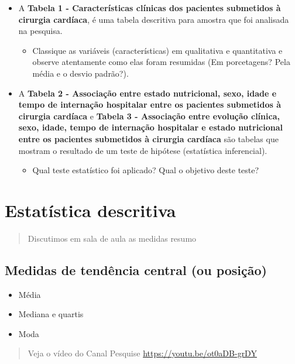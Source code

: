\documentclass[
]{book}
\providecommand{\tightlist}{%
  \setlength{\itemsep}{0pt}\setlength{\parskip}{0pt}}
\begin{document}
\begin{itemize}
\item
  A \textbf{Tabela 1 - Características clínicas dos pacientes submetidos à cirurgia cardíaca}, é uma tabela descritiva para amostra que foi analisada na pesquisa.

  \begin{itemize}
  \tightlist
  \item
    Classique as variáveis (características) em qualitativa e quantitativa e observe atentamente como elas foram resumidas (Em porcetagens? Pela média e o desvio padrão?).
  \end{itemize}
\item
  A \textbf{Tabela 2 - Associação entre estado nutricional, sexo, idade e tempo de internação hospitalar entre os pacientes submetidos à cirurgia cardíaca} e \textbf{Tabela 3 - Associação entre evolução clínica, sexo, idade, tempo de internação hospitalar e estado nutricional entre os pacientes submetidos à cirurgia cardíaca} são tabelas que mostram o resultado de um teste de hipótese (estatística inferencial).

  \begin{itemize}
  \tightlist
  \item
    Qual teste estatístico foi aplicado? Qual o objetivo deste teste?
  \end{itemize}
\end{itemize}

\chapter{Estatística descritiva}\label{estatuxedstica-descritiva}

\begin{quote}
Discutimos em sala de aula as medidas resumo
\end{quote}

\section{Medidas de tendência central (ou posição)}\label{medidas-de-tenduxeancia-central-ou-posiuxe7uxe3o}

\begin{itemize}
\item
  Média
\item
  Mediana e quartis
\item
  Moda
\end{itemize}

\begin{quote}
Veja o vídeo do Canal Pesquise \url{https://youtu.be/ot0aDB-grDY}
\end{quote}
\end{document}
